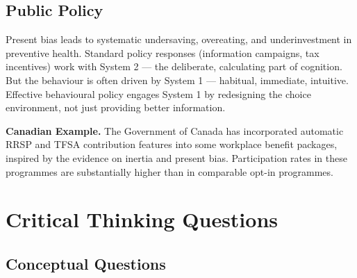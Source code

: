 \documentclass[12pt, letterpaper]{article}
\begin{document}
\subsection{Public Policy}


Present bias leads to systematic undersaving, overeating, and underinvestment in preventive health. Standard policy responses (information campaigns, tax incentives) work with System 2 --- the deliberate, calculating part of cognition. But the behaviour is often driven by System 1 --- habitual, immediate, intuitive. Effective behavioural policy engages System 1 by redesigning the choice environment, not just providing better information.

\textbf{Canadian Example.} The Government of Canada has incorporated automatic RRSP and TFSA contribution features into some workplace benefit packages, inspired by the evidence on inertia and present bias. Participation rates in these programmes are substantially higher than in comparable opt-in programmes.
\newpage


\section*{Critical Thinking Questions}



\subsection{Conceptual Questions}
\end{document}

